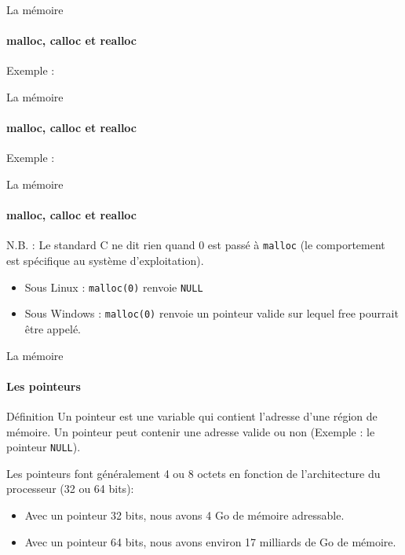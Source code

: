 	\begin{frame}{La mémoire}
		\framesubtitle{malloc, calloc et realloc}
		\begin{exampleblock}{Exemple :}
			\reallocExampleOne
		\end{exampleblock}
	\end{frame}

	\begin{frame}{La mémoire}
		\framesubtitle{malloc, calloc et realloc}
		\begin{exampleblock}{Exemple :}
			\reallocExampleTwo
		\end{exampleblock}
	\end{frame}

	\begin{frame}{La mémoire}
		\framesubtitle{malloc, calloc et realloc}
		\begin{alertblock}{N.B. :}
			Le standard C ne dit rien quand 0 est passé à \texttt{malloc} (le comportement est spécifique au système d'exploitation).
			\begin{itemize}
				\item Sous Linux : \texttt{malloc(0)} renvoie \texttt{NULL}
				\item Sous Windows : \texttt{malloc(0)} renvoie un pointeur \alert{valide} sur lequel free pourrait être appelé.
			\end{itemize}
		\end{alertblock}
	\end{frame}

	\begin{frame}{La mémoire}
		\framesubtitle{Les pointeurs}
		\begin{block}{Définition}
			Un pointeur est une variable qui contient l'adresse d'une région de mémoire. Un pointeur peut contenir une adresse valide ou non (Exemple : le pointeur \texttt{NULL}). \\
		\end{block}
		Les pointeurs font généralement 4 ou 8 octets en fonction de l'architecture du processeur (32 ou 64 bits): 
		\begin{itemize}
			\item Avec un pointeur 32 bits, nous avons 4 Go de mémoire adressable.
			\item Avec un pointeur 64 bits, nous avons environ 17 milliards de Go de mémoire.
		\end{itemize}
	\end{frame}


